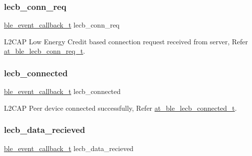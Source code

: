 \mbox{\label{structble__l2cap__event__cb_a002fffb184fdde115a456e619b25bd9b}} 
\subsubsection{\texorpdfstring{lecb\_conn\_req}{lecb\_conn\_req}}
{\footnotesize\ttfamily \mbox{\hyperlink{ble__manager_8h_a04ce4bb8cb8282f2762e3924b1773cc9}{ble\+\_\+event\+\_\+callback\+\_\+t}} lecb\+\_\+conn\+\_\+req}



L2\+C\+AP Low Energy Credit based connection request received from server, Refer \mbox{\hyperlink{structat__ble__lecb__conn__req__t}{at\+\_\+ble\+\_\+lecb\+\_\+conn\+\_\+req\+\_\+t}}. 

\mbox{\label{structble__l2cap__event__cb_a0909a0ce0fb27144b5a7533754269102}} 
\subsubsection{\texorpdfstring{lecb\_connected}{lecb\_connected}}
{\footnotesize\ttfamily \mbox{\hyperlink{ble__manager_8h_a04ce4bb8cb8282f2762e3924b1773cc9}{ble\+\_\+event\+\_\+callback\+\_\+t}} lecb\+\_\+connected}



L2\+C\+AP Peer device connected successfully, Refer \mbox{\hyperlink{structat__ble__lecb__connected__t}{at\+\_\+ble\+\_\+lecb\+\_\+connected\+\_\+t}}. 

\mbox{\label{structble__l2cap__event__cb_afff1e6a8ba1e7b5622704c1c6f7a3f6c}} 
\subsubsection{\texorpdfstring{lecb\_data\_recieved}{lecb\_data\_recieved}}
{\footnotesize\ttfamily \mbox{\hyperlink{ble__manager_8h_a04ce4bb8cb8282f2762e3924b1773cc9}{ble\+\_\+event\+\_\+callback\+\_\+t}} lecb\+\_\+data\+\_\+recieved}



